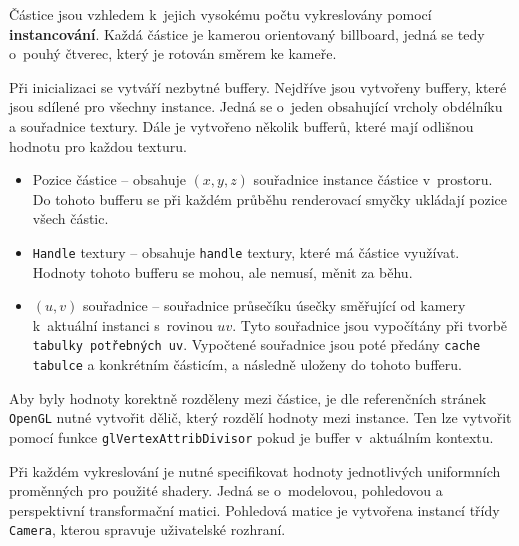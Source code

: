Částice jsou vzhledem k~jejich vysokému počtu vykreslovány pomocí \textbf{instancování}. Každá částice je kamerou orientovaný billboard, jedná se tedy o~pouhý čtverec, který je rotován směrem ke kameře.  

Při inicializaci se vytváří nezbytné buffery. Nejdříve jsou vytvořeny buffery, které jsou sdílené pro všechny instance. Jedná se o~jeden obsahující vrcholy obdélníku a souřadnice textury. Dále je vytvořeno několik bufferů, které mají odlišnou  hodnotu pro každou texturu.
\begin{itemize}
    \item Pozice částice -- obsahuje $(x,y,z)$ souřadnice instance částice v~prostoru. Do tohoto bufferu se při každém průběhu renderovací smyčky ukládají pozice všech částic. 
    \item \texttt{Handle} textury -- obsahuje \texttt{handle} textury, které má částice využívat. Hodnoty tohoto bufferu se mohou, ale nemusí, měnit za běhu. 
    \item $(u,v)$ souřadnice -- souřadnice průsečíku úsečky směřující od kamery k~aktuální instanci s~rovinou $uv$. Tyto souřadnice jsou vypočítány při tvorbě \texttt{tabulky potřebných uv}. Vypočtené souřadnice jsou poté předány \texttt{cache tabulce} a konkrétním částicím, a následně uloženy do tohoto bufferu.
\end{itemize}
Aby byly hodnoty korektně rozděleny mezi částice, je dle referenčních stránek \texttt{OpenGL}\cite{glrefpages} nutné vytvořit dělič, který rozdělí hodnoty mezi instance. Ten lze vytvořit pomocí funkce \texttt{glVertexAttribDivisor} pokud je buffer v~aktuálním kontextu. 

Při každém vykreslování je nutné specifikovat hodnoty jednotlivých uniformních proměnných pro použité shadery. Jedná se o~modelovou, pohledovou a perspektivní transformační matici. Pohledová matice je vytvořena instancí třídy \texttt{Camera}, kterou spravuje uživatelské rozhraní.

